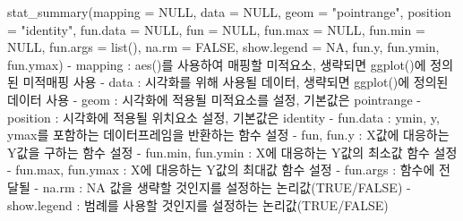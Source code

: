\documentclass[
]{article}
\newenvironment{Shaded}{\begin{snugshade}}{\end{snugshade}}
\newcommand{\AttributeTok}[1]{\textcolor[rgb]{0.77,0.63,0.00}{#1}}
\newcommand{\ConstantTok}[1]{\textcolor[rgb]{0.00,0.00,0.00}{#1}}
\newcommand{\FunctionTok}[1]{\textcolor[rgb]{0.00,0.00,0.00}{#1}}
\newcommand{\NormalTok}[1]{#1}
\newcommand{\SpecialCharTok}[1]{\textcolor[rgb]{0.00,0.00,0.00}{#1}}
\newcommand{\StringTok}[1]{\textcolor[rgb]{0.31,0.60,0.02}{#1}}
\begin{document}
\begin{Shaded}
\begin{Highlighting}[]
\FunctionTok{stat\_summary}\NormalTok{(}\AttributeTok{mapping =} \ConstantTok{NULL}\NormalTok{, }\AttributeTok{data =} \ConstantTok{NULL}\NormalTok{, }\AttributeTok{geom =} \StringTok{"pointrange"}\NormalTok{, }\AttributeTok{position =} \StringTok{"identity"}\NormalTok{, }\AttributeTok{fun.data =} \ConstantTok{NULL}\NormalTok{, }\AttributeTok{fun =} \ConstantTok{NULL}\NormalTok{, }\AttributeTok{fun.max =} \ConstantTok{NULL}\NormalTok{, }\AttributeTok{fun.min =} \ConstantTok{NULL}\NormalTok{, }\AttributeTok{fun.args =} \FunctionTok{list}\NormalTok{(), }\AttributeTok{na.rm =} \ConstantTok{FALSE}\NormalTok{, }\AttributeTok{show.legend =} \ConstantTok{NA}\NormalTok{, fun.y, fun.ymin, fun.ymax)}
  \SpecialCharTok{{-}}\NormalTok{ mapping }\SpecialCharTok{:} \FunctionTok{aes}\NormalTok{()를 사용하여 매핑할 미적요소, 생략되면 }\FunctionTok{ggplot}\NormalTok{()에 정의된 미적매핑 사용}
  \SpecialCharTok{{-}}\NormalTok{ data }\SpecialCharTok{:}\NormalTok{ 시각화를 위해 사용될 데이터, 생략되면 }\FunctionTok{ggplot}\NormalTok{()에 정의된 데이터 사용}
  \SpecialCharTok{{-}}\NormalTok{ geom }\SpecialCharTok{:}\NormalTok{ 시각화에 적용될 미적요소를 설정, 기본값은 }\StringTok{\textquotesingle{}pointrange\textquotesingle{}}
  \SpecialCharTok{{-}}\NormalTok{ position }\SpecialCharTok{:}\NormalTok{ 시각화에 적용될 위치요소 설정, 기본값은 }\StringTok{\textquotesingle{}identity\textquotesingle{}}
  \SpecialCharTok{{-}}\NormalTok{ fun.data }\SpecialCharTok{:}\NormalTok{ ymin, y, ymax를 포함하는 데이터프레임을 반환하는 함수 설정}
  \SpecialCharTok{{-}}\NormalTok{ fun, fun.y }\SpecialCharTok{:}\NormalTok{ X값에 대응하는 Y값을 구하는 함수 설정}
  \SpecialCharTok{{-}}\NormalTok{ fun.min, fun.ymin }\SpecialCharTok{:}\NormalTok{ X에 대응하는 Y값의 최소값 함수 설정}
  \SpecialCharTok{{-}}\NormalTok{ fun.max, fun.ymax }\SpecialCharTok{:}\NormalTok{  X에 대응하는 Y값의 최대값 함수 설정}
  \SpecialCharTok{{-}}\NormalTok{ fun.args }\SpecialCharTok{:}\NormalTok{ 함수에 전달될 }
  \SpecialCharTok{{-}}\NormalTok{ na.rm }\SpecialCharTok{:} \ConstantTok{NA}\NormalTok{ 값을 생략할 것인지를 설정하는 논리값(}\ConstantTok{TRUE}\SpecialCharTok{/}\ConstantTok{FALSE}\NormalTok{)}
  \SpecialCharTok{{-}}\NormalTok{ show.legend }\SpecialCharTok{:}\NormalTok{ 범례를 사용할 것인지를 설정하는 논리값(}\ConstantTok{TRUE}\SpecialCharTok{/}\ConstantTok{FALSE}\NormalTok{) }
\end{Highlighting}
\end{Shaded}
\end{document}
